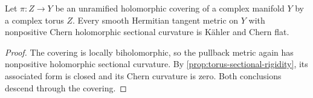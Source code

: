 \begin{corollary}\label{cor:torus-cover-sectional-rigidity}
Let $\pi\colon Z\to Y$ be an unramified holomorphic covering of a complex manifold $Y$ by a complex torus $Z$. Every smooth Hermitian tangent metric on $Y$ with nonpositive Chern holomorphic sectional curvature is K\"ahler and Chern flat.
\end{corollary}
\begin{proof}
The covering is locally biholomorphic, so the pullback metric again has nonpositive holomorphic sectional curvature. By \cref{prop:torus-sectional-rigidity}, its associated form is closed and its Chern curvature is zero. Both conclusions descend through the covering.
\end{proof}
